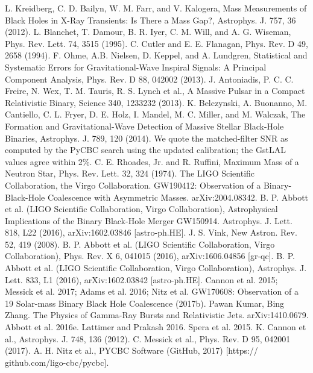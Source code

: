 \documentclass[binding=0.6cm, LaM]{sapthesis}
\begin{document}
\begin{thebibliography}{500}
	 L. Kreidberg, C. D. Bailyn, W. M. Farr, and V. Kalogera, Mass Measurements of Black Holes in X-Ray Transients: Is There a Mass Gap?, Astrophys. J. 757, 36 (2012). 
	 L. Blanchet, T. Damour, B. R. Iyer, C. M. Will, and A. G. Wiseman, Phys. Rev. Lett. 74, 3515 (1995).
	 C. Cutler and E. E. Flanagan, Phys. Rev. D 49, 2658 (1994). 
	 F. Ohme, A.B. Nielsen, D. Keppel, and A. Lundgren, Statistical and Systematic Errors for Gravitational-Wave Inspiral Signals: A Principal Component Analysis, Phys. Rev. D 88, 042002 (2013). 
	 J. Antoniadis, P. C. C. Freire, N. Wex, T. M. Tauris, R. S. Lynch et al., A Massive Pulsar in a Compact Relativistic Binary, Science 340, 1233232 (2013). 
	 K. Belczynski, A. Buonanno, M. Cantiello, C. L. Fryer, D. E. Holz, I. Mandel, M. C. Miller, and M. Walczak, The Formation and Gravitational-Wave Detection of Massive Stellar Black-Hole Binaries, Astrophys. J. 789, 120 (2014). 
	 We quote the matched-filter SNR as computed by the PyCBC search using the updated calibration; the GstLAL values agree within 2\%. 
	 C. E. Rhoades, Jr. and R. Ruffini, Maximum Mass of a Neutron Star, Phys. Rev. Lett. 32, 324 (1974).
         The LIGO Scientific Collaboration, the Virgo Collaboration. GW190412: Observation of a Binary-Black-Hole Coalescence with Asymmetric Masses. arXiv:2004.08342.
	 B. P. Abbott et al. (LIGO Scientific Collaboration, Virgo Collaboration), Astrophysical Implications of the Binary Black-Hole Merger GW150914. Astrophys. J. Lett. 818, L22 (2016), arXiv:1602.03846 [astro-ph.HE]. 
	 J. S. Vink, New Astron. Rev. 52, 419 (2008).
	 B. P. Abbott et al. (LIGO Scientific Collaboration, Virgo Collaboration), Phys. Rev. X 6, 041015 (2016), arXiv:1606.04856 [gr-qc]. 
	 B. P. Abbott et al. (LIGO Scientific Collaboration, Virgo Collaboration), Astrophys. J. Lett. 833, L1 (2016), arXiv:1602.03842 [astro-ph.HE]. 
	 Cannon et al. 2015; Messick et al. 2017; Adams et al. 2016; Nitz et al. GW170608: Observation of a 19 Solar-mass Binary Black Hole Coalescence (2017b).
	 Pawan Kumar, Bing Zhang. The Physics of Gamma-Ray Bursts and Relativistic Jets. arXiv:1410.0679.
	 Abbott et al. 2016e.
	 Lattimer and Prakash 2016.
	 Spera et al. 2015.
	 K. Cannon et al., Astrophys. J. 748, 136 (2012).
	 C. Messick et al., Phys. Rev. D 95, 042001 (2017).
	 A. H. Nitz et al., PYCBC Software (GitHub, 2017) [https:// github.com/ligo-cbc/pycbc].

\end{thebibliography}
\end{document}
